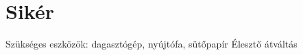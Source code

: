 \chapter*{Sikér}

\lipsum[1]

Szükséges eszközök: dagasztógép, nyújtófa, sütőpapír
Élesztő átváltás




